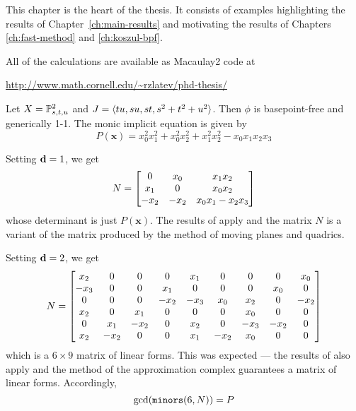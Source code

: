 \documentclass[fleqn,reqno]{amsart}
\begin{document}



\begin{paragraf*}
This chapter is the heart of the thesis.
It consists of examples highlighting the results of Chapter~\ref{ch:main-results}
and motivating the results of Chapters \ref{ch:fast-method} and \ref{ch:koszul-bpf}.

All of the calculations are available as Macaulay2 code at
\begin{center}
\url{http://www.math.cornell.edu/~rzlatev/phd-thesis/}
\end{center}
\end{paragraf*}



\begin{example}[$\mt{ex301}$]
\label{ex301}
Let $X=\mathbb{P}^2_{s,t,u}$ and $J=\langle tu,su,st,s^2+t^2+u^2\rangle$.
Then $\phi$ is basepoint-free and generically 1-1.
The monic implicit equation is given by
\[
	P(\mathbf x)={x}_{0}^{2} {x}_{1}^{2}+{x}_{0}^{2} {x}_{2}^{2}+{x}_{1}^{2}
	{x}_{2}^{2}-{x}_{0} {x}_{1} {x}_{2} {x}_{3}
\]

Setting $\mathbf d=1$, we get
\[
	N=
	\bgroup\begin{bmatrix}0&
      {x}_{0}&
      {x}_{1} {x}_{2}\\
      {x}_{1}&
      0&
      {x}_{0} {x}_{2}\\
      {-{x}_{2}}&
      {-{x}_{2}}&
      {x}_{0} {x}_{1}-{x}_{2} {x}_{3}\\
      \end{bmatrix}\egroup
\]
whose determinant is just $P(\mathbf x)$.
The results of \citet{CGZ-00} apply and the matrix $N$ is a variant of the matrix
produced by the method of moving planes and quadrics.

Setting $\mathbf d=2$, we get
\[
	N=
	\bgroup\begin{bmatrix}{x}_{2}&
	      0&
	      0&
	      0&
	      {x}_{1}&
	      0&
	      0&
	      0&
	      {x}_{0}\\
	      {-{x}_{3}}&
	      0&
	      0&
	      {x}_{1}&
	      0&
	      0&
	      0&
	      {x}_{0}&
	      0\\
	      0&
	      0&
	      0&
	      {-{x}_{2}}&
	      {-{x}_{3}}&
	      {x}_{0}&
	      {x}_{2}&
	      0&
	      {-{x}_{2}}\\
	      {x}_{2}&
	      0&
	      {x}_{1}&
	      0&
	      0&
	      0&
	      {x}_{0}&
	      0&
	      0\\
	      0&
	      {x}_{1}&
	      {-{x}_{2}}&
	      0&
	      {x}_{2}&
	      0&
	      {-{x}_{3}}&
	      {-{x}_{2}}&
	      0\\
	      {x}_{2}&
	      {-{x}_{2}}&
	      0&
	      0&
	      {x}_{1}&
	      {-{x}_{2}}&
	      {x}_{0}&
	      0&
	      0\\
	      \end{bmatrix}\egroup
\]
which is a $6\times9$ matrix of linear forms.
This was expected --- the results of \cite{BJ-03} also apply and the method
of the approximation complex guarantees a matrix of linear forms.
Accordingly,
\[
	\gcd(\mathop{\tt minors}(6,N))=P
\]


\end{example}
\end{document}

